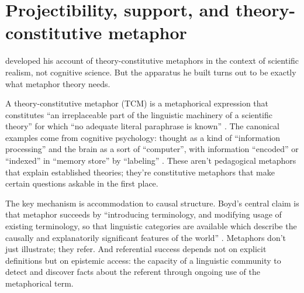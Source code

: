 \documentclass[12pt]{article}
\begin{document}
\section{Projectibility, support, and theory-constitutive metaphor}
\label{sec:hpc-tcm}

\textcite{boyd1979} developed his account of theory-constitutive metaphors in the context of scientific realism, not cognitive science. But the apparatus he built turns out to be exactly what metaphor theory needs.

A theory-constitutive metaphor (TCM) is a metaphorical expression that constitutes \enquote{an irreplaceable part of the linguistic machinery of a scientific theory} for which \enquote{no adequate literal paraphrase is known} \citep[360]{boyd1979}. The canonical examples come from cognitive psychology: thought as a kind of
\enquote{information processing} and the brain as a sort of \enquote{computer},
with information \enquote{encoded} or \enquote{indexed} in \enquote{memory
store} by \enquote{labeling} \citep[486]{boyd1993metaphor}. These aren't pedagogical metaphors that explain established theories; they're constitutive metaphors that make certain questions askable in the first place.

The key mechanism is accommodation to causal structure. Boyd's central claim is that metaphor succeeds by \enquote{introducing terminology, and modifying usage of existing terminology, so that linguistic categories are available which describe the causally and explanatorily significant features of the world} \citep[358]{boyd1979}. Metaphors don't just illustrate; they refer. And referential success depends not on explicit definitions but on epistemic access: the capacity of a linguistic community to detect and discover facts about the referent through ongoing use of the metaphorical term.
\end{document}
